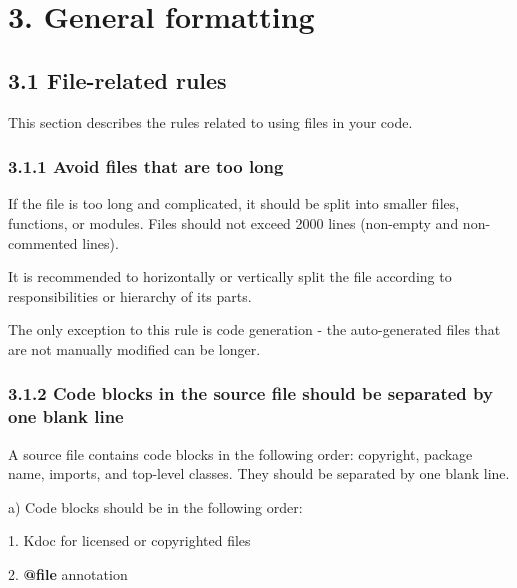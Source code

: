 \section*{\textbf{3. General formatting}}

\label{sec:3.}

\subsection*{\textbf{3.1 File-related rules}}

\label{sec:3.1}

This section describes the rules related to using files in your code.

\subsubsection*{\textbf{3.1.1 Avoid files that are too long}}
\leavevmode\newline

\label{sec:3.1.1}



If the file is too long and complicated, it should be split into smaller files, functions, or modules. Files should not exceed 2000 lines (non-empty and non-commented lines).

It is recommended to horizontally or vertically split the file according to responsibilities or hierarchy of its parts.

The only exception to this rule is code generation - the auto-generated files that are not manually modified can be longer.



\subsubsection*{\textbf{3.1.2 Code blocks in the source file should be separated by one blank line}}
\leavevmode\newline

\label{sec:3.1.2}

A source file contains code blocks in the following order: copyright, package name, imports, and top-level classes. They should be separated by one blank line.



a) Code blocks should be in the following order:

1.	Kdoc for licensed or copyrighted files

2.	\textbf{@file} annotation

